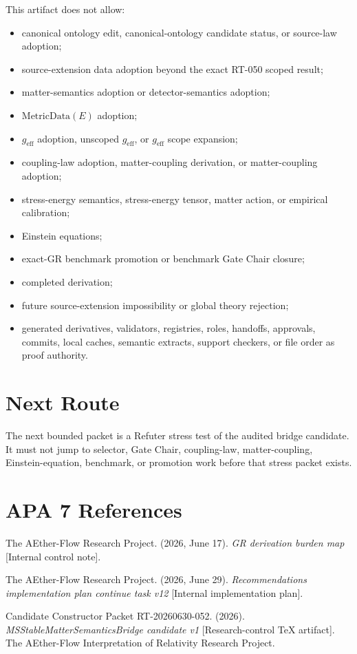 \documentclass[11pt]{article}
\newcommand{\MetricData}{\mathrm{MetricData}}
\newcommand{\geff}{g_{\mathrm{eff}}}
\begin{document}
This artifact does not allow:
\begin{itemize}[leftmargin=*]
\item canonical ontology edit, canonical-ontology candidate status, or
source-law adoption;
\item source-extension data adoption beyond the exact RT-050 scoped result;
\item matter-semantics adoption or detector-semantics adoption;
\item \(\MetricData(E)\) adoption;
\item \(\geff\) adoption, unscoped \(\geff\), or \(\geff\) scope expansion;
\item coupling-law adoption, matter-coupling derivation, or matter-coupling
adoption;
\item stress-energy semantics, stress-energy tensor, matter action, or
empirical calibration;
\item Einstein equations;
\item exact-GR benchmark promotion or benchmark Gate Chair closure;
\item completed derivation;
\item future source-extension impossibility or global theory rejection;
\item generated derivatives, validators, registries, roles, handoffs,
approvals, commits, local caches, semantic extracts, support checkers, or
file order as proof authority.
\end{itemize}

\section{Next Route}

The next bounded packet is a Refuter stress test of the audited bridge
candidate. It must not jump to selector, Gate Chair, coupling-law,
matter-coupling, Einstein-equation, benchmark, or promotion work before that
stress packet exists.

\section{APA 7 References}

The AEther-Flow Research Project. (2026, June 17). \emph{GR derivation burden
map} [Internal control note].

The AEther-Flow Research Project. (2026, June 29). \emph{Recommendations
implementation plan continue task v12} [Internal implementation plan].

Candidate Constructor Packet RT-20260630-052. (2026).
\emph{MSStableMatterSemanticsBridge candidate v1} [Research-control TeX
artifact]. The AEther-Flow Interpretation of Relativity Research Project.
\end{document}
